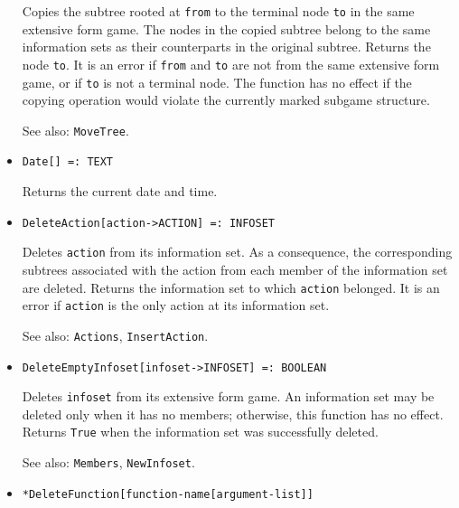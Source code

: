 \begin{itemize}
\bd
Copies the subtree rooted at \verb+from+ to the terminal
node \verb+to+ in the same extensive form game.  The nodes in the
copied subtree belong to the same information sets as their counterparts in
the original subtree.  Returns the node \verb+to+.  It is an error if
\verb+from+ and \verb+to+ are not from the same extensive form game,
or if \verb+to+ is not a terminal node.  The function has no effect if
the copying operation would violate the currently marked subgame
structure.

\item
[See also:] \verb+MoveTree+.
\ed


\item{}
\protect \large \begin{verbatim}
Date[] =: TEXT
\end{verbatim}\normalsize

\bd
Returns the current date and time. 
\ed

\item{}
\protect \large \begin{verbatim}
DeleteAction[action->ACTION] =: INFOSET
\end{verbatim}\normalsize

\bd
Deletes \verb+action+ from its information set. 
As a consequence, the corresponding subtrees associated
with the action from each member of the information set are deleted.
Returns the information set to which \verb+action+ belonged.  It is an
error if \verb+action+ is the only action at its information set.
\item [See also:] \verb+Actions+, \verb+InsertAction+.
\ed

\item{}
\protect \large \begin{verbatim}
DeleteEmptyInfoset[infoset->INFOSET] =: BOOLEAN
\end{verbatim}\normalsize

\bd
Deletes \verb+infoset+ from its extensive form game.  An information set
may be deleted only when it has no members; otherwise, this function has
no effect.  Returns \verb+True+ when the information set was successfully
deleted.
\item [See also:] \verb+Members+, \verb+NewInfoset+.
\ed

\item{}
\protect \large \begin{verbatim}
*DeleteFunction[function-name[argument-list]]
\end{verbatim}\normalsize


\end{itemize}

